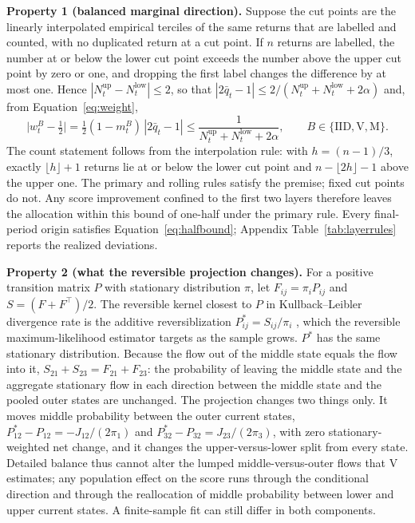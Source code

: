 \textbf{Property 1 (balanced marginal direction).} Suppose the cut points are the linearly interpolated empirical terciles of the same returns that are labelled and counted, with no duplicated return at a cut point. If $n$ returns are labelled, the number at or below the lower cut point exceeds the number above the upper cut point by zero or one, and dropping the first label changes the difference by at most one. Hence $|N^{\mathrm{up}}_t-N^{\mathrm{low}}_t|\le2$, so that $|2\bar q_t-1|\le2/(N^{\mathrm{up}}_t+N^{\mathrm{low}}_t+2\alpha)$ and, from Equation~\eqref{eq:weight},
\begin{equation}
\bigl|w^{B}_t-\tfrac12\bigr|=\tfrac12(1-m^{B}_t)\,|2\bar q_t-1|\le\frac{1}{N^{\mathrm{up}}_t+N^{\mathrm{low}}_t+2\alpha},\qquad B\in\{\mathrm{IID},\mathrm V,\mathrm M\}.
\label{eq:halfbound}
\end{equation}
The count statement follows from the interpolation rule: with $h=(n-1)/3$, exactly $\lfloor h\rfloor+1$ returns lie at or below the lower cut point and $n-\lfloor 2h\rfloor-1$ above the upper one. The primary and rolling rules satisfy the premise; fixed cut points do not. Any score improvement confined to the first two layers therefore leaves the allocation within this bound of one-half under the primary rule. Every final-period origin satisfies Equation~\eqref{eq:halfbound}; Appendix Table~\ref{tab:layerrules} reports the realized deviations.

\textbf{Property 2 (what the reversible projection changes).} For a positive transition matrix $P$ with stationary distribution $\pi$, let $F_{ij}=\pi_iP_{ij}$ and $S=(F+F^\top)/2$. The reversible kernel closest to $P$ in Kullback--Leibler divergence rate is the additive reversiblization $P^\ast_{ij}=S_{ij}/\pi_i$ \citep[Theorem~6.1]{WolferWatanabe2021}, which the reversible maximum-likelihood estimator targets as the sample grows. $P^\ast$ has the same stationary distribution. Because the flow out of the middle state equals the flow into it, $S_{21}+S_{23}=F_{21}+F_{23}$: the probability of leaving the middle state and the aggregate stationary flow in each direction between the middle state and the pooled outer states are unchanged. The projection changes two things only. It moves middle probability between the outer current states, $P^\ast_{12}-P_{12}=-J_{12}/(2\pi_1)$ and $P^\ast_{32}-P_{32}=J_{23}/(2\pi_3)$, with zero stationary-weighted net change, and it changes the upper-versus-lower split from every state. Detailed balance thus cannot alter the lumped middle-versus-outer flows that V estimates; any population effect on the score runs through the conditional direction and through the reallocation of middle probability between lower and upper current states. A finite-sample fit can still differ in both components.

